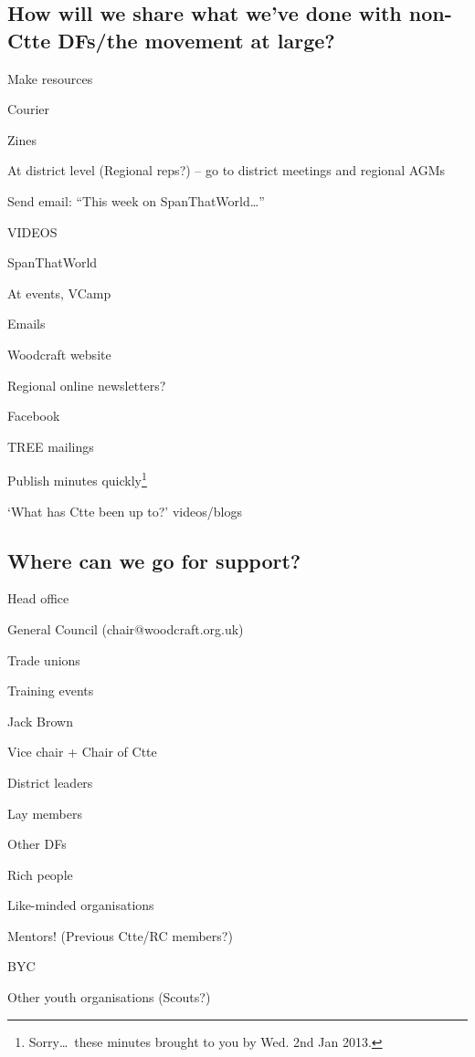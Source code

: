 \documentclass[a4paper, 12pt]{article}
\begin{document}
\subsection{How will we share what we've done with non-Ctte DFs/the movement at large?}
\begin{itemize*}
	\item Make resources
	\item Courier
	\item Zines
	\item At district level (Regional reps?) -- go to district meetings and regional AGMs
	\item Send email: ``This week on SpanThatWorld\ldots''
	\item VIDEOS
	\item SpanThatWorld
	\item At events, VCamp
	\item Emails
	\item Woodcraft website
	\item Regional online newsletters?
	\item Facebook
	\item TREE mailings
	\item Publish minutes quickly\footnote{Sorry\ldots~these minutes brought to you by Wed. 2nd Jan 2013.}
	\item `What has Ctte been up to?' videos/blogs
\end{itemize*}

\subsection{Where can we go for support?}
\begin{itemize*}
	\item Head office
	\item General Council (chair@woodcraft.org.uk)
	\item Trade unions
	\item Training events
	\item Jack Brown
	\item Vice chair + Chair of Ctte
	\item District leaders
	\item Lay members
	\item Other DFs
	\item Rich people
	\item Like-minded organisations
	\item Mentors! (Previous Ctte/RC members?)
	\item BYC
	\item Other youth organisations (Scouts?)
\end{itemize*}
\end{document}
